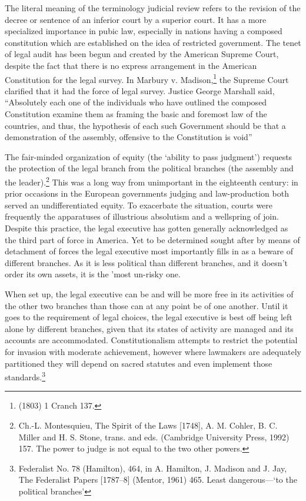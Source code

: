 \begin{multicols}{2}
\noi
The literal meaning of the terminology judicial review refers to the revision of the decree or
sentence of an inferior court by a superior court. It has a more specialized importance in
pubic law, especially in nations having a composed constitution which are established on the
idea of restricted government. The tenet of legal audit has been begun and created by the
American Supreme Court, despite the fact that there is no express arrangement in the
American Constitution for the legal survey. In Marbury v. Madison,\footnote{(1803) 1 Cranch 137.} the Supreme Court
clarified that it had the force of legal survey. Justice George Marshall said, “Absolutely each
one of the individuals who have outlined the composed Constitution examine them as
framing the basic and foremost law of the countries, and thus, the hypothesis of each such
Government should be that a demonstration of the assembly, offensive to the Constitution is
void”

\vspace{.02cm}

\noi
The fair-minded organization of equity (the ‘ability to pass judgment') requests the protection
of the legal branch from the political branches (the assembly and the leader).\footnote{Ch.-L. Montesquieu, The Spirit of the Laws [1748], A. M. Cohler, B. C. Miller and H. S. Stone, trans. and eds. (Cambridge University Press, 1992) 157. The power to judge is not equal to the two other powers.} This was a
long way from unimportant in the eighteenth century: in prior occasions in the European
governments judging and law-production both served an undifferentiated equity. To
exacerbate the situation, courts were frequently the apparatuses of illustrious absolutism and
a wellspring of join. Despite this practice, the legal executive has gotten generally
acknowledged as the third part of force in America. Yet to be determined sought after by
means of detachment of forces the legal executive most importantly fills in as a beware of
different branches. As it is less political than different branches, and it doesn't order its own
assets, it is the 'most un-risky one.

\vspace{.02cm}

\noi
When set up, the legal executive can be and will be more free in its activities of the other two
branches than those can at any point be of one another. Until it goes to the requirement of
legal choices, the legal executive is best off being left alone by different branches, given that
its states of activity are managed and its accounts are accommodated. Constitutionalism
attempts to restrict the potential for invasion with moderate achievement, however where 
lawmakers are adequately partitioned they will depend on sacred statutes and even implement
those standards.\footnote{Federalist No. 78 (Hamilton), 464, in A. Hamilton, J. Madison and J. Jay, The Federalist Papers [1787–8] (Mentor, 1961) 465. Least dangerous—‘to the political branches’}


\end{multicols}
